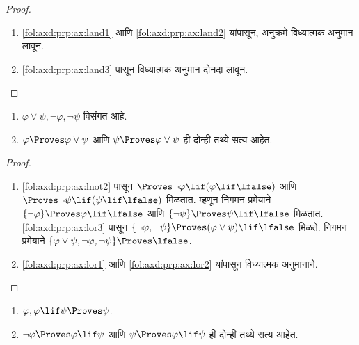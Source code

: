 \begin{proof}
  \begin{enumerate}
    \item \ref{fol:axd:prp:ax:land1} आणि \ref{fol:axd:prp:ax:land2} यांपासून,
      अनुक्रमे विध्यात्मक अनुमान लावून.

  \item \ref{fol:axd:prp:ax:land3} पासून विध्यात्मक अनुमान दोनदा लावून.
  \end{enumerate}
\end{proof}


\begin{prop}\label{fol:axd:ppr:prop:provability-lor}
  \begin{enumerate}
  \item $\varphi \lor \psi, \lnot \varphi, \lnot \psi$ विसंगत आहे.
  \item $\varphi \Proves \varphi \lor \psi$ आणि $\psi \Proves \varphi \lor \psi$ ही दोन्ही
    तथ्ये सत्य आहेत.
  \end{enumerate}
\end{prop}

\begin{proof}
  \begin{enumerate}
  \item \ref{fol:axd:prp:ax:lnot2} पासून $\Proves \lnot \varphi \lif (\varphi
    \lif \lfalse)$ आणि $\Proves \lnot \psi \lif (\psi \lif \lfalse)$
    मिळतात. म्हणून निगमन प्रमेयाने $\{\lnot \varphi\} \Proves \varphi \lif
    \lfalse$ आणि $\{\lnot \psi\} \Proves \psi \lif \lfalse$ मिळतात.
    \ref{fol:axd:prp:ax:lor3} पासून $\{\lnot \varphi, \lnot \psi\} \Proves (\varphi
    \lor \psi) \lif \lfalse$ मिळते. निगमन प्रमेयाने $\{\varphi \lor \psi,
    \lnot \varphi, \lnot \psi\} \Proves \lfalse$.

  \item \ref{fol:axd:prp:ax:lor1} आणि \ref{fol:axd:prp:ax:lor2} यांपासून विध्यात्मक
    अनुमानाने.
  \end{enumerate}
\end{proof}

\begin{prop}\label{fol:axd:ppr:prop:provability-lif}
  \begin{enumerate}
  \item \label{fol:axd:ppr:prop:provability-lif-left} $\varphi, \varphi \lif \psi \Proves \psi$.
  \item \label{fol:axd:ppr:prop:provability-lif-right}
    $\lnot \varphi \Proves \varphi \lif \psi$ आणि $\psi \Proves \varphi \lif \psi$ ही दोन्ही
    तथ्ये सत्य आहेत.
  \end{enumerate}
\end{prop}

